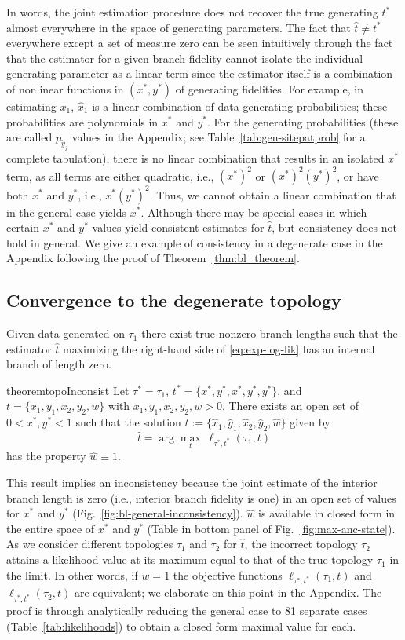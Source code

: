 \documentclass[11pt]{article}
\newcommand{\siteSplit}{\tilde{y}}
\begin{document}
In words, the joint estimation procedure does not recover the true generating $t^*$ almost everywhere in the space of generating parameters.
The fact that $\hat{t} \neq t^*$ everywhere except a set of measure zero can be seen intuitively through the fact that the estimator for a given branch fidelity cannot isolate the individual generating parameter as a linear term since the estimator itself is a combination of nonlinear functions in $(x^*,y^*)$ of generating fidelities.
For example, in estimating $x_1$, $\hat{x}_1$ is a linear combination of data-generating probabilities; these probabilities are polynomials in $x^*$ and $y^*$.
For the generating probabilities (these are called $p_{\siteSplit_j}$ values in the Appendix; see Table~\ref{tab:gen-sitepatprob} for a complete tabulation), there is no linear combination that results in an isolated $x^*$ term, as all terms are either quadratic, i.e., $(x^*)^2$ or $(x^*)^2(y^*)^2$, or have both $x^*$ and $y^*$, i.e., $x^*(y^*)^2$.
Thus, we cannot obtain a linear combination that in the general case yields $x^*$.
Although there may be special cases in which certain $x^*$ and $y^*$ values yield consistent estimates for $\hat{t}$, but consistency does not hold in general.
We give an example of consistency in a degenerate case in the Appendix following the proof of Theorem~\ref{thm:bl_theorem}.

\subsection*{Convergence to the degenerate topology}
Given data generated on $\tau_1$ there exist true nonzero branch lengths such that the estimator $\hat{t}$ maximizing the right-hand side of \eqref{eq:exp-log-lik} has an internal branch of length zero.
\begin{restatable}{theorem}{topoInconsist}
\label{thm:topo_theorem}
Let $\tau^*=\tau_1$, $t^*=\{x^*, y^*, x^*, y^*, y^*\}$, and $t=\{x_1, y_1, x_2, y_2, w\}$ with $x_1, y_1, x_2, y_2, w > 0$.
There exists an open set of $0 < x^*, y^* < 1$ such that the solution $\hat{t} := \{\hat{x}_1,\hat{y}_1,\hat{x}_2,\hat{y}_2,\hat{w}\}$ given by
\[
\hat{t} = \arg\max_{t} \ \ell_{\tau^*,t^*}(\tau_1, t)
\]
has the property $\hat{w}\equiv 1$.
\end{restatable}

This result implies an inconsistency because the joint estimate of the interior branch length is zero (i.e., interior branch fidelity is one) in an open set of values for $x^*$ and $y^*$ (Fig.~\ref{fig:bl-general-inconsistency}).
$\hat{w}$ is available in closed form in the entire space of $x^*$ and $y^*$ (Table in bottom panel of Fig.~\ref{fig:max-anc-state}).
As we consider different topologies $\tau_1$ and $\tau_2$ for $\hat{t}$, the incorrect topology $\tau_2$ attains a likelihood value at its maximum equal to that of the true topology $\tau_1$ in the limit.
In other words, if $w=1$ the objective functions $\ell_{\tau^*,t^*}(\tau_1, t)$ and $\ell_{\tau^*,t^*}(\tau_2, t)$ are equivalent; we elaborate on this point in the Appendix.
The proof is through analytically reducing the general case to 81 separate cases (Table~\ref{tab:likelihoods}) to obtain a closed form maximal value for each.
\end{document}
